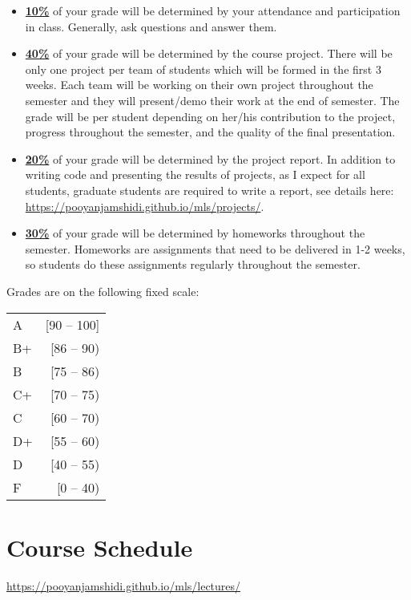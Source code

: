 \documentclass[11pt]{article}
\begin{document}
\begin{itemize}
  \item \underline{\textbf{10\%}} of your grade will be determined by your attendance and participation in class. Generally, ask questions and answer them.

  \item \underline{\textbf{40\%}} of your grade will be determined by the course project. There will be only one project per team of students which will be formed in the first 3 weeks. Each team will be working on their own project throughout the semester and they will present/demo their work at the end of semester. The grade will be per student depending on her/his contribution to the project, progress throughout the semester, and the quality of the final presentation.

  \item \underline{\textbf{20\%}} of your grade will be determined by the project report. In addition to writing code and presenting the results of projects, as I expect for all students, graduate students are required to write a report, see details here: \url{https://pooyanjamshidi.github.io/mls/projects/}. 

  \item \underline{\textbf{30\%}} of your grade will be determined by homeworks throughout the semester. Homeworks are assignments that need to be delivered in 1-2 weeks, so students do these assignments regularly throughout the semester.


\end{itemize}


Grades are on the following fixed scale:

\begin{tabular}{lr}
A & [90 -- 100] \\
B+ &  [86 -- 90) \\
B & [75 -- 86)\\
C+  & [70 -- 75)\\
C&  [60 -- 70)\\
D+ &  [55 -- 60)\\
D & [40 -- 55)\\
F & [0 -- 40)\\

\end{tabular}


\newpage

\section*{Course Schedule}
\url{https://pooyanjamshidi.github.io/mls/lectures/}
\end{document}
